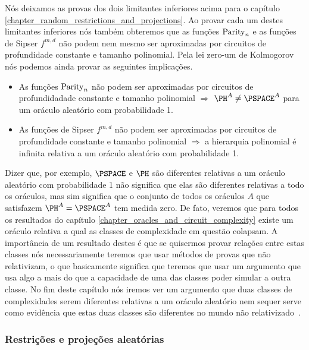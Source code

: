 Nós deixamos as provas dos dois limitantes inferiores acima para o capítulo \ref{chapter_random_restrictions_and_projections}. Ao provar cada um destes limitantes inferiores nós também obteremos que as funções $\text{Parity}_{n}$ e as funções de Sipser $f^{m, d}$ não podem nem mesmo ser aproximadas por circuitos de profundidade constante e tamanho polinomial. Pela lei zero-um de Kolmogorov nós podemos ainda provar as seguintes implicações.

\begin{itemize}

    \item As funções $\text{Parity}_{n}$ não podem ser aproximadas por circuitos de profundidadade constante e tamanho polinomial $\Rightarrow$ $\PH^{A} \neq \PSPACE^{A}$ para um oráculo aleatório com probabilidade 1.
    
    \item As funções de Sipser $f^{m, d}$ não podem ser aproximadas por circuitos de profundidade constante e tamanho polinomial $\Rightarrow$ a hierarquia polinomial é infinita relativa a um oráculo aleatório com probabilidade 1.

\end{itemize}

Dizer que, por exemplo, $\PSPACE$ e $\PH$ são diferentes relativas a um oráculo aleatório com probabilidade 1 não significa que elas são diferentes relativas a todo os oráculos, mas sim significa que o conjunto de todos os oráculos $A$ que satisfazem $\PH^{A} = \PSPACE^{A}$ tem medida zero. De fato, veremos que para todos os resultados do capítulo \ref{chapter_oracles_and_circuit_complexity} existe um oráculo relativa a qual as classes de complexidade em questão colapsam. A importância de um resultado destes é que se quisermos provar relações entre estas classes nós necessariamente teremos que usar métodos de provas que não relativizam, o que basicamente significa que teremos que usar um argumento que usa algo a mais do que a capacidade de uma das classes poder simular a outra classe. No fim deste capítulo nós iremos ver um argumento que duas classes de complexidades serem diferentes relativas a um oráculo aleatório nem sequer serve como evidência que estas duas classes são diferentes no mundo não relativizado~\cite{fortnow1994role}.

\subsubsection{Restrições e projeções aleatórias}

